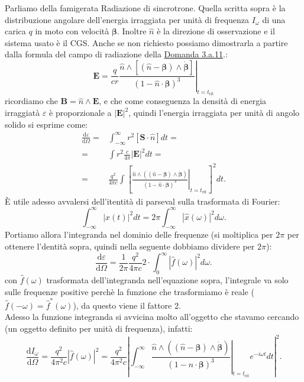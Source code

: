 \label{sec:3.a.14}
Parliamo della famigerata Radiazione di sincrotrone.
Quella scritta sopra è la distribuzione angolare dell'energia irraggiata per unità di frequenza $I_{\omega}$ di una carica $q$ in moto con velocità  $\boldsymbol{\beta}$. Inoltre $\hat{n}$ è la direzione di osservazione e il sistema usato è il CGS. 
Anche se non richiesto possiamo dimostrarla a partire dalla formula del campo di radiazione della \hyperref[sec:3.a.11]{Domanda 3.a.11}.:
\[
	\boldsymbol{E}= \left. \frac{q}{cr}
	\frac{\hat{n}\wedge\left[\left(\hat{n}-\boldsymbol{\beta}\right)\wedge\dot{\boldsymbol{\beta}}\right]}
	{\left(1-\hat{n}\cdot \boldsymbol{\beta}\right)^3} \right|_{t=t_{\text{rit}}}
\]
ricordiamo che $\boldsymbol{B}=\hat{n}\wedge \boldsymbol{E}$, e che come conseguenza la densità di energia irraggiatà $\varepsilon$ è proporzionale a $\left| \boldsymbol{E} \right| ^2$, quindi l'energia irraggiata per unità di angolo solido si esprime come:
\begin{align*}
	\frac{\mbox{d} \varepsilon}{\mbox{d} \Omega} =& \int_{-\infty}^{\infty}r^2 \left[ \boldsymbol{S}\cdot\hat{n}\right] dt =\\
	=& \int r^2 \frac{c}{4\pi}\left| \boldsymbol{E} \right|^2 dt = \\
	=& \frac{q^2}{4\pi c} \int \left[ \left. \frac{ \hat{n} \wedge \left( \left( \hat{n}-\boldsymbol{\beta} \right)\wedge\dot{\boldsymbol{\beta}}\right)}
		{\left( 1- \hat{n}\cdot \boldsymbol{\beta} \right)^3 } \right|_{t = t_{\text{rit}}} \right]^2 dt
.\end{align*}
È utile adesso avvalersi dell'itentità di parseval sulla trasformata di Fourier:
\[
	\int_{-\infty}^{\infty} \left| x\left( t \right)  \right|^2 dt = 2\pi \int_{-\infty}^{\infty} \left| \hat{x}\left( \omega \right)\right|^2d\omega 
.\] 
Portiamo allora l'integranda nel dominio delle frequenze (si moltiplica per $2\pi$ per ottenere l'dentità sopra, quindi nella seguente dobbiamo dividere per $2\pi$):
\[
	\frac{\mbox{d} \varepsilon}{\mbox{d} \Omega} = \frac{1}{2\pi}  \frac{q^2}{4\pi c} 2 \cdot\int_0^{\infty} \left| \hat{f}\left( \omega \right) \right|^2 d \omega 
.\] 
con $\hat{f}\left( \omega \right) $ trasformata dell'integranda nell'equazione sopra, l'integrale va solo sulle frequenze positive perchè la funzione che trasformiamo è reale ($\hat{f}\left( -\omega \right) = \hat{f}^*\left( \omega \right) $), da questo viene il fattore 2.\\
Adesso la funzione integranda si avvicina molto all'oggetto che stavamo cercando (un oggetto definito per unità di frequenza), infatti:
\[
	\frac{\mbox{d} I_{\omega}}{\mbox{d} \Omega} = \frac{q^2}{4\pi^2 c} \left| \hat{f}\left( \omega \right)  \right|^2 =  \frac{q^2}{4\pi^2 c} 
	\left| \int_{-\infty}^{\infty} \left. \frac{ \hat{n} \wedge \left( \left( \hat{n}-\boldsymbol{\beta} \right)\wedge\dot{\boldsymbol{\beta}}\right)}
		{\left( 1- \hat{n}\cdot \boldsymbol{\beta} \right)^3 } \right|_{t = t_{\text{rit}}} e^{-i\omega t} dt \right|^2 
.\]
